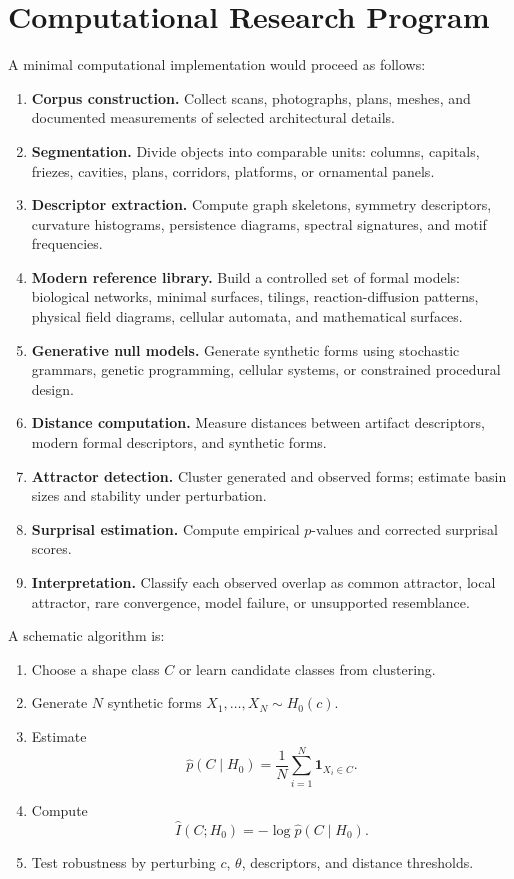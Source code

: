 \documentclass[11pt,a4paper]{article}
\begin{document}
\section{Computational Research Program}

A minimal computational implementation would proceed as follows:

\begin{enumerate}[label=\arabic*.]
    \item \textbf{Corpus construction.} Collect scans, photographs, plans, meshes, and documented measurements of selected architectural details.
    \item \textbf{Segmentation.} Divide objects into comparable units: columns, capitals, friezes, cavities, plans, corridors, platforms, or ornamental panels.
    \item \textbf{Descriptor extraction.} Compute graph skeletons, symmetry descriptors, curvature histograms, persistence diagrams, spectral signatures, and motif frequencies.
    \item \textbf{Modern reference library.} Build a controlled set of formal models: biological networks, minimal surfaces, tilings, reaction-diffusion patterns, physical field diagrams, cellular automata, and mathematical surfaces.
    \item \textbf{Generative null models.} Generate synthetic forms using stochastic grammars, genetic programming, cellular systems, or constrained procedural design.
    \item \textbf{Distance computation.} Measure distances between artifact descriptors, modern formal descriptors, and synthetic forms.
    \item \textbf{Attractor detection.} Cluster generated and observed forms; estimate basin sizes and stability under perturbation.
    \item \textbf{Surprisal estimation.} Compute empirical $p$-values and corrected surprisal scores.
    \item \textbf{Interpretation.} Classify each observed overlap as common attractor, local attractor, rare convergence, model failure, or unsupported resemblance.
\end{enumerate}

A schematic algorithm is:
\begin{enumerate}[label=\arabic*.]
    \item Choose a shape class $C$ or learn candidate classes from clustering.
    \item Generate $N$ synthetic forms $X_1,\dots,X_N\sim H_0(c)$.
    \item Estimate
    \begin{equation}
        \widehat{p}(C\mid H_0)=\frac{1}{N}\sum_{i=1}^{N}\mathbf{1}_{X_i\in C}.
    \end{equation}
    \item Compute
    \begin{equation}
        \widehat{I}(C;H_0)=-\log \widehat{p}(C\mid H_0).
    \end{equation}
    \item Test robustness by perturbing $c$, $\theta$, descriptors, and distance thresholds.
\end{enumerate}
\end{document}

